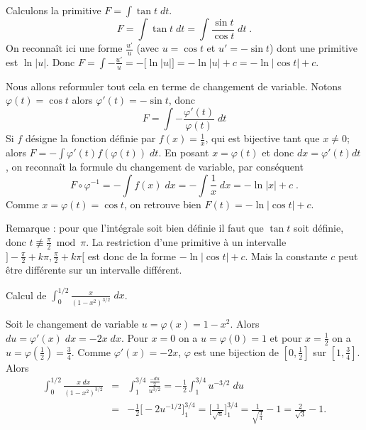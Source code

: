 \documentclass[class=report,crop=false]{standalone}
\begin{document}
\begin{exemple}
Calculons la primitive $F = \int \tan t \; dt$.
\[
F=\int \tan t \; dt = \int \frac{\sin t}{\cos t} \; dt \; .
\]
On reconnaît ici une forme $\frac{u'}{u}$ (avec $u=\cos t$ et $u'=-\sin t$) dont une primitive est $\ln|u|$.
Donc $F = \int -\frac{u'}{u} = -\big[\ln |u| \big] = -\ln|u|+c = -\ln|\cos t|+c$.

\bigskip

Nous allons reformuler tout cela en terme de changement de variable.
Notons $\varphi(t)= \cos t$ alors $\varphi'(t) = -\sin t$, donc
\[
F = \int -\frac{\varphi'(t)}{\varphi(t)} \; dt
\]
Si $f$ désigne la fonction définie par $f(x)=\frac1x$, qui est bijective tant que $x \neq 0$;
alors $F = - \int \varphi'(t) f(\varphi(t))\; dt$.
En posant $x = \varphi(t)$ et donc $dx = \varphi'(t) dt$, on reconnaît la formule du changement de variable,
par conséquent
\[
F \circ \varphi^{-1} = -\int f(x) \; dx=-\int \frac1x \;dx
= -\ln|x|+c \; .
\]
Comme $x = \varphi(t)=\cos t$, on retrouve bien $F(t) = -\ln|\cos t| + c$.

Remarque : pour que l'intégrale soit bien définie il faut que $\tan t$ soit définie,
donc $t \not\equiv \frac{\pi}{2} \bmod \pi$. La restriction d'une primitive à un intervalle
$]-\frac{\pi}{2} + k \pi, \frac{\pi}{2} + k \pi[$ est donc de la forme $-\ln|\cos t| + c$.
Mais la constante $c$ peut être différente sur un intervalle différent.
\end{exemple}

\begin{exemple}
Calcul de $\int_0^{1/2}\frac{x}{(1-x^2)^{3/2}} \;dx$.

Soit le changement de variable $u=\varphi(x) = 1-x^2$. Alors $du = \varphi'(x) \; dx = -2x \; dx$.
Pour $x=0$ on a $u=\varphi(0)=1$ et pour $x=\frac12$ on a $u=\varphi(\frac{1}{2})=\frac34$.
Comme $\varphi'(x)=-2x$, $\varphi$ est une bijection de $[0,\frac{1}{2}]$ sur $[1,\frac{3}{4}]$. Alors
\begin{eqnarray*}
\int_0^{1/2}\frac{x \; dx}{(1-x^2)^{3/2}} 
  &=& \int_1^{3/4} \frac{\frac{-du}{2}}{u^{3/2}}
  = -\frac12\int_1^{3/4} u^{-3/2}\;du \\
  &=& -\frac12\big[-2u^{-1/2}\big]_1^{3/4}
  =\big[\frac1{\sqrt{u}}\big]_1^{3/4} 
  = \frac1{\sqrt{\frac34}}-1= \frac{2}{\sqrt3}-1.
\end{eqnarray*}
\end{exemple}
\end{document}
